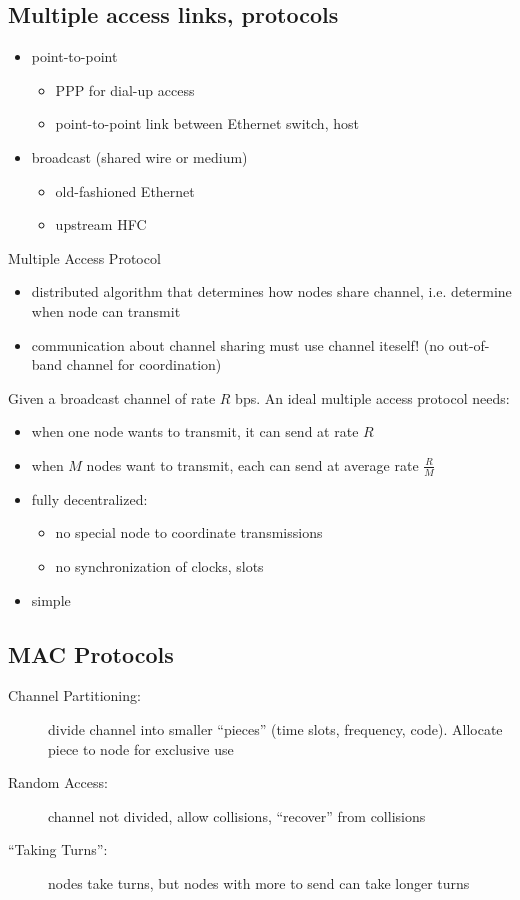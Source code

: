\subsection{Multiple access links, protocols}
\begin{itemize}
	\item point-to-point
	\begin{itemize}
		\item PPP for dial-up access
		\item point-to-point link between Ethernet switch, host
	\end{itemize}
	\item broadcast (shared wire or medium)
	\begin{itemize}
		\item old-fashioned Ethernet
		\item upstream HFC
	\end{itemize}
\end{itemize}
\begin{note}{Multiple Access Protocol}
	\begin{itemize}
		\item distributed algorithm that determines how nodes share channel, i.e. determine when node can transmit
		\item communication about channel sharing must use channel iteself! (no out-of-band channel for coordination)
	\end{itemize}
\end{note}
Given a broadcast channel of rate $R$ bps. An ideal multiple access protocol needs:
\begin{itemize}
	\item when one node wants to transmit, it can send at rate $R$
	\item when $M$ nodes want to transmit, each can send at average rate $\frac{R}{M}$
	\item fully decentralized:
	\begin{itemize}
		\item no special node to coordinate transmissions
		\item no synchronization of clocks, slots
	\end{itemize}
	\item simple
\end{itemize}
\subsection{MAC Protocols}
\begin{description}
	\item[Channel Partitioning:] divide channel into smaller ``pieces'' (time slots, frequency, code). Allocate piece to node for exclusive use
	\item[Random Access:] channel not divided, allow collisions, ``recover'' from collisions
	\item[``Taking Turns'':] nodes take turns, but nodes with more to send can take longer turns
\end{description}
